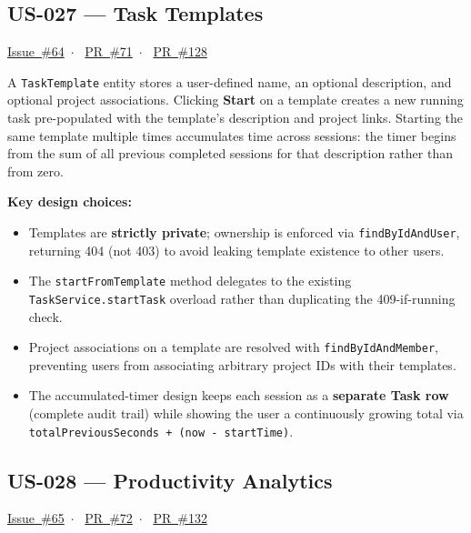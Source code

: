 \documentclass[a4paper, 12pt]{article}
\begin{document}
\subsection{US-027 --- Task Templates}

\href{https://github.com/se2p-classrooms/final-project-AliAkbarBaloch/issues/64}{Issue~\#64}~$\cdot$~%
\href{https://github.com/se2p-classrooms/final-project-AliAkbarBaloch/pull/71}{PR~\#71}~$\cdot$~%
\href{https://github.com/se2p-classrooms/final-project-AliAkbarBaloch/pull/128}{PR~\#128}

A \texttt{TaskTemplate} entity stores a user-defined name, an optional description, and
optional project associations. Clicking \textbf{Start} on a template creates a new running
task pre-populated with the template's description and project links. Starting the same
template multiple times accumulates time across sessions: the timer begins from the sum of
all previous completed sessions for that description rather than from zero.

\textbf{Key design choices:}
\begin{itemize}
  \item Templates are \textbf{strictly private}; ownership is enforced via
        \texttt{findByIdAndUser}, returning 404 (not 403) to avoid leaking template existence
        to other users.
  \item The \texttt{startFromTemplate} method delegates to the existing
        \texttt{TaskService.startTask} overload rather than duplicating the
        409-if-running check.
  \item Project associations on a template are resolved with \texttt{findByIdAndMember},
        preventing users from associating arbitrary project IDs with their templates.
  \item The accumulated-timer design keeps each session as a \textbf{separate Task row}
        (complete audit trail) while showing the user a continuously growing total via
        \texttt{totalPreviousSeconds + (now - startTime)}.
\end{itemize}

\subsection{US-028 --- Productivity Analytics}

\href{https://github.com/se2p-classrooms/final-project-AliAkbarBaloch/issues/65}{Issue~\#65}~$\cdot$~%
\href{https://github.com/se2p-classrooms/final-project-AliAkbarBaloch/pull/72}{PR~\#72}~$\cdot$~%
\href{https://github.com/se2p-classrooms/final-project-AliAkbarBaloch/pull/132}{PR~\#132}
\end{document}
